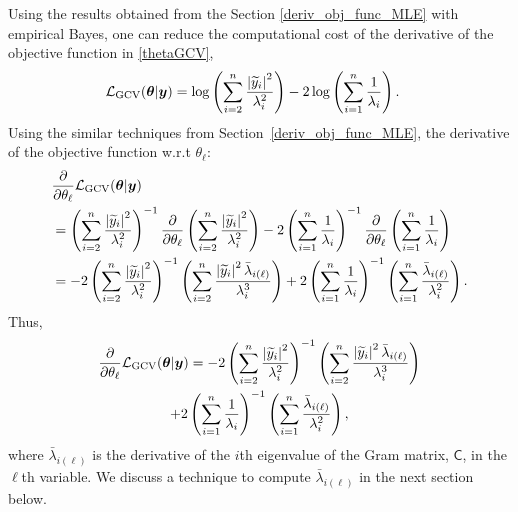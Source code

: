 \documentclass{svjour3}                     %
\newcommand{\bm}[1]{\boldsymbol{#1}}
\newcommand{\vtheta}{{\bm{\theta}}}
\newcommand{\vy}{\bm{y}}
\newcommand{\mC}{\mathsf{C}}
\newcommand{\GCV}{\textup{GCV}}
\def\abs#1{\ensuremath{\left \lvert #1 \right \rvert}}
\newcommand\secref{Section~\ref}
\begin{document}
Using the results obtained from the Section \ref{deriv_obj_func_MLE} with empirical Bayes, one can reduce the computational cost of the derivative of the objective function in \eqref{thetaGCV},
\begin{align*}
\mathcal{L}_\GCV(\vtheta | \vy)
&= \log \left ( \sum_{i=2}^n \frac{\abs{\widetilde{y}_i}^2}{\lambda_i^2} 
\right) -2\log\left( \sum_{i=1}^n \frac{1}{\lambda_i} \right).
\end{align*}
Using the similar techniques from \secref{deriv_obj_func_MLE}, the derivative of the objective function w.r.t $\theta_\ell$:
\begin{align*}
& \frac{\partial}{\partial \theta_\ell}  \mathcal{L}_\GCV(\vtheta | \vy)
\\
&= \left ( \sum_{i=2}^n \frac{\abs{\widetilde{y}_i}^2}{\lambda_i^2} \right)^{-1}
\frac{\partial}{\partial \theta_\ell} \left ( \sum_{i=2}^n \frac{\abs{\widetilde{y}_i}^2}{\lambda_i^2} \right)
-2 \left( \sum_{i=1}^n \frac{1}{\lambda_i} \right)^{-1}
\frac{\partial}{\partial \theta_\ell} \left( \sum_{i=1}^n \frac{1}{\lambda_i} \right)
\\
&= -2 \left ( \sum_{i=2}^n \frac{\abs{\widetilde{y}_i}^2}{\lambda_i^2} \right)^{-1}
\left ( \sum_{i=2}^n \frac{\abs{\widetilde{y}_i}^2 \bar{\lambda}_{i(\ell)} }{\lambda_i^3}    \right)
+ 2 \left( \sum_{i=1}^n \frac{1}{\lambda_i} \right)^{-1}
\left( \sum_{i=1}^n \frac{\bar{\lambda}_{i(\ell)} }{\lambda_i^2}  \right).
\end{align*}
Thus,
\begin{multline}
\frac{\partial}{\partial \theta_\ell}  \mathcal{L}_\GCV(\vtheta | \vy)
\label{eqn:deriv_obj_func_full}
= -2 \left ( \sum_{i=2}^n \frac{\abs{\widetilde{y}_i}^2}{\lambda_i^2} \right)^{-1}
\left ( \sum_{i=2}^n \frac{\abs{\widetilde{y}_i}^2 \bar{\lambda}_{i(\ell)} }{\lambda_i^3}    \right) \\
+ 2 \left( \sum_{i=1}^n \frac{1}{\lambda_i} \right)^{-1}
\left( \sum_{i=1}^n \frac{\bar{\lambda}_{i(\ell)} }{\lambda_i^2}  \right),
\end{multline}
where $\bar{\lambda}_{i(\ell)}$ is the derivative of the $i$th eigenvalue of the Gram matrix, $\mC$, in the $\ell$th variable. We discuss a technique to compute $\bar{\lambda}_{i(\ell)}$ in the next section below.
\end{document}
